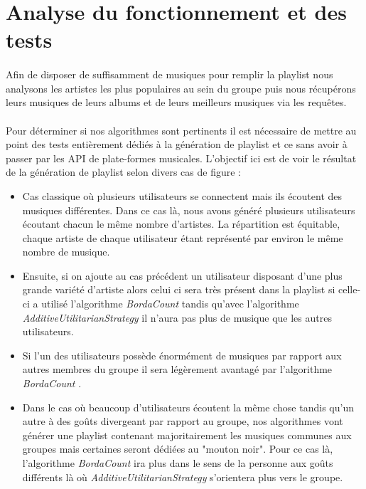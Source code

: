 \documentclass[12pt, openany]{report}
\begin{document}
\section{Analyse du fonctionnement et des tests}
\paragraph{}Afin de disposer de suffisamment de musiques pour remplir la playlist nous analysons les artistes les plus populaires au sein du groupe puis nous récupérons leurs musiques de leurs albums et de leurs meilleurs musiques via les requêtes.
\paragraph{}Pour déterminer si nos algorithmes sont pertinents il est nécessaire de mettre au point des tests entièrement dédiés à la génération de playlist et ce sans avoir à passer par les API de plate-formes musicales.
\newpage
L'objectif ici est de voir le résultat de la génération de playlist selon divers cas de figure :
\begin{itemize}
\item Cas classique où plusieurs utilisateurs se connectent mais ils écoutent des musiques différentes. Dans ce cas là, nous avons généré plusieurs utilisateurs écoutant chacun le même nombre d'artistes. La répartition est équitable, chaque artiste de chaque utilisateur étant représenté par environ le même nombre de musique.
\item Ensuite, si on ajoute au cas précédent un utilisateur disposant d'une plus grande variété d'artiste alors celui ci sera très présent dans la playlist si celle-ci a utilisé l'algorithme \textit{BordaCount} tandis qu'avec l'algorithme \textit{AdditiveUtilitarianStrategy} il n'aura pas plus de musique que les autres utilisateurs.
\item Si l'un des utilisateurs possède énormément de musiques par rapport aux autres membres du groupe il sera légèrement avantagé par l'algorithme \textit{BordaCount} .
\item Dans le cas où beaucoup d'utilisateurs écoutent la même chose tandis qu'un autre à des goûts divergeant par rapport au groupe, nos algorithmes vont générer une playlist contenant majoritairement les musiques communes aux groupes mais certaines seront dédiées au "mouton noir". Pour ce cas là, l'algorithme \textit{BordaCount} ira plus dans le sens de la personne aux goûts différents là où \textit{AdditiveUtilitarianStrategy} s'orientera plus vers le groupe.
\end{itemize}
\end{document}
